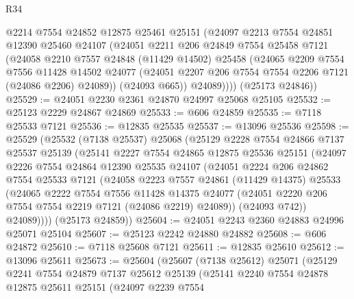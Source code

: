 \begin{lexlean}{R34}
\begin{coremodule}
          @2214
          @7554
          @24852
          @12875
          @25461
          @25151
          (@24097
            @2213
            @7554
            @24851
            @12390
            @25460
            @24107
            (@24051
              @2211
              @206
              @24849
              @7554
              @25458
              @7121
              (@24058
                @2210
                @7557
                @24848
                (@11429 @14502)
                @25458
                (@24065
                  @2209
                  @7554
                  @7556
                  @11428
                  @14502
                  @24077
                  (@24051 @2207 @206 @7554 @7554 @2206 @7121 (@24086 @2206) @24089))
                (@24093 @665))
              @24089))))
      (@25173 @24846))
@25529 := @24051 @2230 @2361 @24870 @24997 @25068 @25105
@25532 := @25123 @2229 @24867 @24869
@25533 := @606 @24859
@25535 := @7118 @25533 @7121
@25536 := @12835 @25535
@25537 := @13096 @25536
@25598 := @25529
    (@25532
      (@7138 @25537)
      @25068
      (@25129
        @2228
        @7554
        @24866
        @7137
        @25537
        @25139
        (@25141
          @2227
          @7554
          @24865
          @12875
          @25536
          @25151
          (@24097
            @2226
            @7554
            @24864
            @12390
            @25535
            @24107
            (@24051
              @2224
              @206
              @24862
              @7554
              @25533
              @7121
              (@24058
                @2223
                @7557
                @24861
                (@11429 @14375)
                @25533
                (@24065
                  @2222
                  @7554
                  @7556
                  @11428
                  @14375
                  @24077
                  (@24051 @2220 @206 @7554 @7554 @2219 @7121 (@24086 @2219) @24089))
                (@24093 @742))
              @24089))))
      (@25173 @24859))
@25604 := @24051 @2243 @2360 @24883 @24996 @25071 @25104
@25607 := @25123 @2242 @24880 @24882
@25608 := @606 @24872
@25610 := @7118 @25608 @7121
@25611 := @12835 @25610
@25612 := @13096 @25611
@25673 := @25604
    (@25607
      (@7138 @25612)
      @25071
      (@25129
        @2241
        @7554
        @24879
        @7137
        @25612
        @25139
        (@25141
          @2240
          @7554
          @24878
          @12875
          @25611
          @25151
          (@24097
            @2239
            @7554

\end{coremodule}
\end{lexlean}
